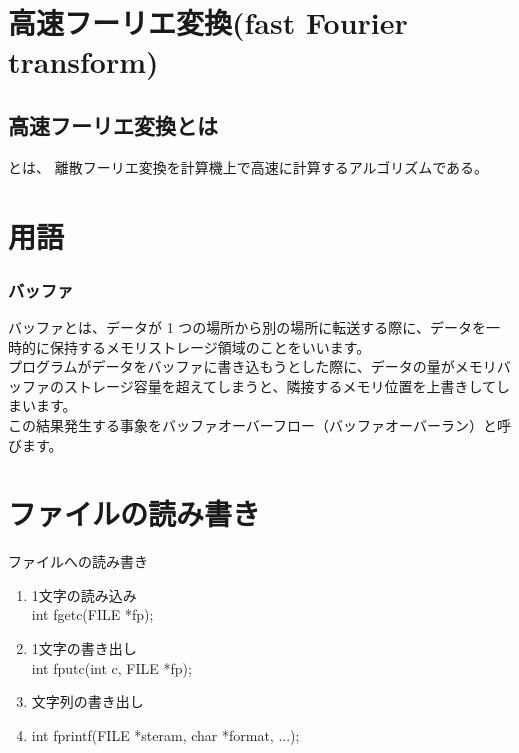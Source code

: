 \documentclass[a4paper]{jsarticle}
\begin{document}
\section{高速フーリエ変換(fast Fourier transform)}
\subsection{高速フーリエ変換とは}
とは、
離散フーリエ変換を計算機上で高速に計算するアルゴリズムである。

\section{用語}
\subsubsection*{バッファ}
バッファとは、データが 1 つの場所から別の場所に転送する際に、データを一時的に保持するメモリストレージ領域のことをいいます。\\
プログラムがデータをバッファに書き込もうとした際に、データの量がメモリバッファのストレージ容量を超えてしまうと、隣接するメモリ位置を上書きしてしまいます。\\
この結果発生する事象をバッファオーバーフロー（バッファオーバーラン）と呼びます。\\
\section{ファイルの読み書き}

\begin{itembox}[l]{ファイルへの読み書き}
    \begin{enumerate}[(1)]
        \item 1文字の読み込み\\
              int fgetc(FILE *fp);
        \item 1文字の書き出し\\
              int fputc(int c, FILE *fp);
        \item 文字列の書き出し\\
        \item int fprintf(FILE *steram, char *format, ...);
    \end{enumerate}
\end{itembox}
\end{document}
